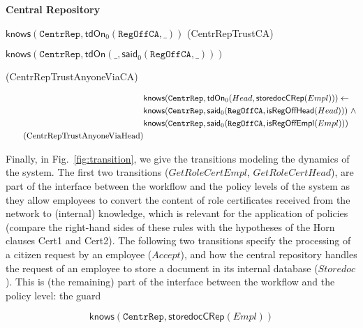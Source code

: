 \documentclass[conference]{IEEEtran}
\begin{document}
\begin{LONG}
\noindent
\textbf{Central Repository } \\
 
\noindent
\begin{small}$\mathsf{knows}(\mathtt{CentrRep},\mathsf{tdOn}_{0}(\mathtt{RegOffCA},\_))$ \hfill (CentrRepTrustCA)\\\end{small}

\noindent
\begin{small}$\mathsf{knows}(\mathtt{CentrRep},\mathsf{tdOn}(\_,\mathsf{said}_{0}(\mathtt{RegOffCA},\_)))$
\begin{flushright}
(CentrRepTrustAnyoneViaCA)
\end{flushright}
\end{small}

\begin{small} \begin{align*}
&\mathsf{knows} (\mathtt{CentrRep},\mathsf{tdOn}_{0}(Head,\mathsf{storedocCRep}(Empl))) \leftarrow \notag \\
& \mathsf{knows}(\mathtt{CentrRep},\mathsf{said}_{0}(\mathtt{RegOffCA},\mathsf{isRegOffHead}(Head))) ~\wedge \notag \\
& \mathsf{knows}(\mathtt{CentrRep},\mathsf{said}_{0}(\mathtt{RegOffCA},\mathsf{isRegOffEmpl}(Empl))) \\
\tag{CentrRepTrustAnyoneViaHead}
 \end{align*}\end{small}

Finally, in Fig.~\ref{fig:transition}, we give the transitions modeling the dynamics of the system.
The first two transitions ($\mathit{GetRoleCertEmpl}$, $\mathit{GetRoleCertHead}$), are part of the interface between the
workflow and the policy levels of the system as they allow employees
to convert the content of role certificates received from the network
to (internal) knowledge, which is relevant for the application of
policies (compare the right-hand sides of these rules with the
hypotheses of the Horn clauses Cert1 and Cert2).
The following two transitions specify the processing of a citizen
request by an employee ($\mathit{Accept}$), and how the central repository handles the request of an
employee to store a document in its internal database ($\mathit{Storedoc}$). This is (the
remaining) part of the interface between the workflow and the policy
level: the guard

\begin{small}     
$$ \mathsf{knows}(\mathtt{CentrRep},\mathsf{storedocCRep} (Empl)) $$
\end{small}


\end{LONG}
\end{document}
